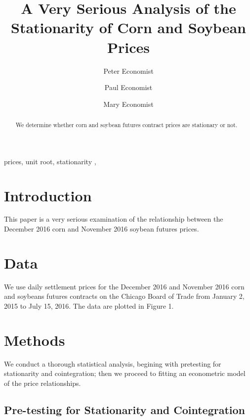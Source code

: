 \documentclass[]{elsarticle} %
\begin{document}
\begin{frontmatter}

  \title{A Very Serious Analysis of the Stationarity of Corn and Soybean Prices}
    \author[University]{Peter Economist}
    \author[University]{Paul Economist}
  
    \author[University]{Mary Economist}
  
      \address[University]{Department of Economics, 101 Scholar Dr, University Town, IL, 55555}
  
  \begin{abstract}
  We determine whether corn and soybean futures contract prices are
  stationary or not.
  \end{abstract}
   \begin{keyword} prices, unit root, stationarity \sep \end{keyword}
 \end{frontmatter}

\section{Introduction}\label{introduction}

This paper is a very serious examination of the relationship between the
December 2016 corn and November 2016 soybean futures prices.

\section{Data}\label{data}

We use daily settlement prices for the December 2016 and November 2016
corn and soybeans futures contracts on the Chicago Board of Trade from
January 2, 2015 to July 15, 2016. The data are plotted in Figure 1.

\section{Methods}\label{methods}

We conduct a thorough statistical analysis, begining with pretesting for
stationarity and cointegration; then we proceed to fitting an
econometric model of the price relationships.

\subsection{Pre-testing for Stationarity and
Cointegration}\label{pre-testing-for-stationarity-and-cointegration}
\end{document}
